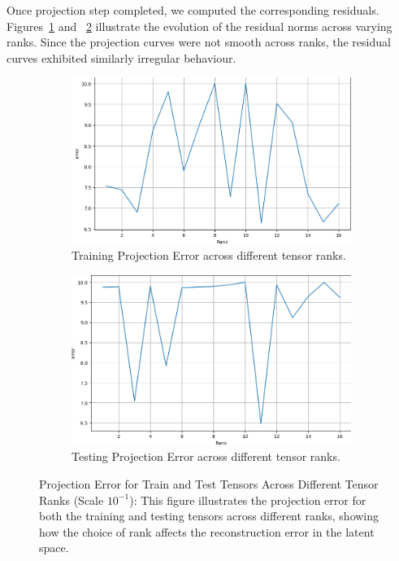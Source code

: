 \documentclass[preprint,12pt,authoryear]{elsarticle}
\begin{document}
\noindent Once projection step completed, we computed the corresponding residuals. Figures~\ref{fig:train-residuals} and ~\ref{fig:test-residuals} illustrate the evolution of the residual norms across varying ranks. Since the projection curves were not smooth across ranks, the residual curves exhibited similarly irregular behaviour.
\begin{figure}[H]
    \centering
    \begin{subfigure}[t]{0.48\linewidth}
        \centering
        \includegraphics[width=\linewidth]{train errors.png}
        \caption{ Training Projection Error across different tensor ranks.}
        \label{fig:train-residuals}
    \end{subfigure}
    \hfill
    \begin{subfigure}[t]{0.48\linewidth}
        \centering
        \includegraphics[width=\linewidth]{test error.png}
        \caption{Testing Projection Error across different tensor ranks.}
        \label{fig:test-residuals}
    \end{subfigure}
    \caption{Projection Error for Train and Test Tensors Across Different Tensor Ranks (Scale $10^{-1}$): This figure illustrates the projection error for both the training and testing tensors across different ranks, showing how the choice of rank affects the reconstruction error in the latent space.}
    \label{fig:train-test-residual}
\end{figure}
 
\end{document}

